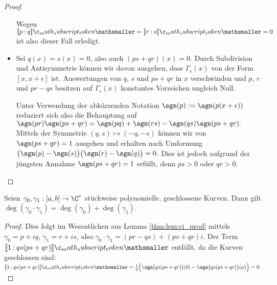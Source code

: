 \documentclass{mythesis}
\begin{document}
\begin{lemma}
\begin{proof}
\begin{itemize}
                Wegen $\Index{}{p}{q} = \Index{}{r}{s} = 0$ ist also dieser Fall erledigt.
            \item
                Sei $q(x) = s(x) = 0$, also auch $(ps + qr)(x) = 0$.
                Durch Subdivision und Antisymmetrie können wir davon ausgehen, dass $\Gamma_\epsilon(x)$ von der Form $[x, x + \epsilon]$ ist.
                Auswertungen von $q$, $s$ und $ps + qr$ in $x$ verschwinden und $p$, $r$ und $pr - qs$ besitzen auf $\Gamma_\epsilon(x)$ konstantes Vorzeichen ungleich Null.

                Unter Verwendung der abkürzenden Notation $\sgn(p) := \sgn(p(x+\epsilon))$ reduziert sich also die Behauptung auf
                \begin{math}
                    \sgn(pr)\sgn(ps+qr)
                    = \sgn(pq) + \sgn(rs) - \sgn(qs)\sgn(ps+qr).
                \end{math}
                Mittels der Symmetrie $(q,s) \mapsto (-q,-s)$ können wir von $\sgn(ps + qr) = 1$ ausgehen und erhalten nach Umformung
                \begin{math}
                    \big(\sgn(p) - \sgn(s)\big)\big(\sgn(r) - \sgn(q)\big) = 0.
                \end{math}
                Dies ist jedoch aufgrund der jüngsten Annahme $\sgn(ps + qr) = 1$ erfüllt, denn $ps > 0$ oder $qr > 0$.
        \end{itemize}
    \end{proof}
\end{lemma}

\begin{corollary}[Multiplikativität] \label{thm:cor:wn1_mult}
    Seien $\gamma_0, \gamma_1: [a,b] \to \C^*$ stückweise polynomielle, geschlossene Kurven.
    Dann gilt
    \begin{math}
        \deg(\gamma_0 \cdot \gamma_1) = \deg(\gamma_0) + \deg(\gamma_1).
    \end{math}
    \begin{proof}
        Dies folgt im Wesentlichen aus Lemma \ref{thm:lem:ci_prod} mittels $\gamma_0 = p + iq$, $\gamma_1 = r + is$, also $\gamma_0\cdot\gamma_1 = (pr-qs) + (ps +qr)i$.
        Der Term $\Index{}{1}{qs(ps+qr)}$ entfällt, da die Kurven geschlossen sind:
        \begin{math}
            \Index{}{1}{qs(ps+qr)}
            = \frac{1}{2}\Big(\sgn\big(qs(ps+qr)\big)(b) - \sgn\big(qs(ps+qr)\big)(a)\Big)
            = 0.
        \end{math}
    \end{proof}
\end{corollary}
\end{document}
